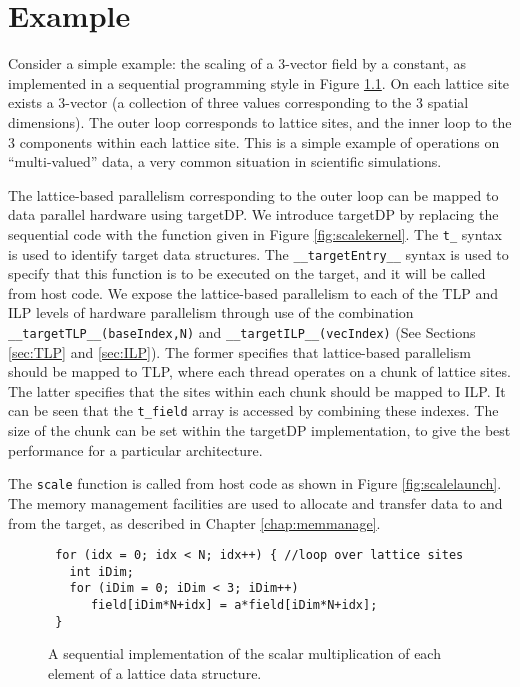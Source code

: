 \chapter{Example}\label{chapter:examples}

Consider a simple example: the scaling of a 3-vector
field by a constant, as implemented in a sequential programming style in Figure \ref{fig:scaleorig}. On each lattice site exists a 3-vector (a collection of three values corresponding to the 3 spatial dimensions). The outer loop corresponds to lattice sites, and the inner loop to the 3 components within each lattice site. This is a simple example of operations on ``multi-valued'' data, a very common situation in scientific simulations. 

The lattice-based parallelism corresponding to the outer loop can be
mapped to data parallel hardware using targetDP. We introduce targetDP
by replacing the sequential code with the function given in Figure
\ref{fig:scalekernel}. The \verb+t_+ syntax is used to identify target
data structures. The \verb+__targetEntry__+ syntax is used to specify
that this function is to be executed on the target, and it will be
called from host code.  We expose the lattice-based parallelism to
each of the TLP and ILP levels of hardware parallelism through use of
the combination \verb+__targetTLP__(baseIndex,N)+ and
\verb+__targetILP__(vecIndex)+ (See Sections \ref{sec:TLP} and
\ref{sec:ILP}). The former specifies that lattice-based parallelism
should be mapped to TLP, where each thread operates on a chunk of
lattice sites. The latter specifies that the sites within each chunk
should be mapped to ILP. It can be seen that the \verb+t_field+ array
is accessed by combining these indexes. The size of the chunk can be
set within the targetDP implementation, to give the best performance
for a particular architecture.

The \verb+scale+ function is called from host code as shown in Figure \ref{fig:scalelaunch}. The memory management facilities are used to allocate and transfer data to and from the target, as described in Chapter \ref{chap:memmanage}.

\begin{figure}[h]
\begin{lstlisting}
 for (idx = 0; idx < N; idx++) { //loop over lattice sites
   int iDim;
   for (iDim = 0; iDim < 3; iDim++) 
      field[iDim*N+idx] = a*field[iDim*N+idx];
 }

\end{lstlisting}
\caption{A sequential implementation of the scalar multiplication of each element of a lattice data structure.}\label{fig:scaleorig}
\end{figure}

